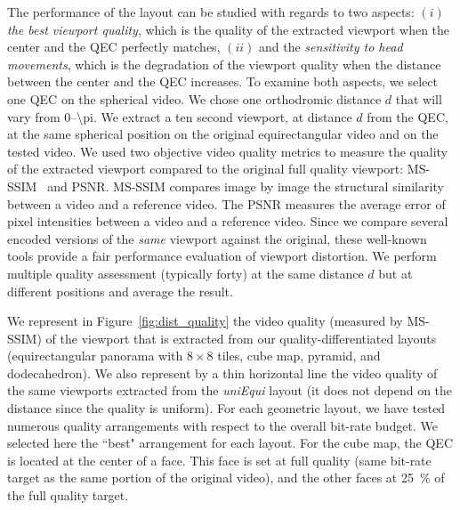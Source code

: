 The performance of the layout can be studied with
regards to two aspects: $(i)$ \emph{the best viewport quality}, which
is the quality of the extracted viewport when the \FoV{} center and
the \ac{QEC} perfectly matches, $(ii)$ and the \emph{sensitivity to
head movements}, which is the degradation of the viewport quality when
the distance between the \FoV{} center and the \ac{QEC} increases.
To examine both aspects, we select one \ac{QEC} on the spherical video.
We chose one orthodromic distance $d$ that will vary from \numrange{0}{\pi}.
We extract a ten second viewport, at distance $d$
from the \ac{QEC}, at the same spherical position on the original
equirectangular video and on the tested video. We used two objective
video quality metrics to measure the quality of the extracted viewport
compared to the original full quality viewport:
\ac{MS-SSIM}~\cite{wang2003multiscale} and
\ac{PSNR}.
\ac{MS-SSIM} compares image by image the structural
similarity between a video and a reference video. The \ac{PSNR} measures the average error of pixel intensities
between a video and a reference video. Since we
compare several encoded versions of the \emph{same} viewport against the
original, these well-known tools provide a fair performance evaluation of viewport distortion.
We perform multiple quality assessment (typically forty) at the same distance $d$ but at different positions and average the result.





We represent in Figure~\ref{fig:dist_quality} the video quality
(measured by \acs{MS-SSIM}) of the viewport that is extracted from our
quality-differentiated layouts (equirectangular panorama with
$8\!\times\! 8$ tiles, cube map, pyramid, and dodecahedron). We also
represent by a thin horizontal line the video quality of the same
viewports extracted from the \textit{uniEqui} layout (it does
not depend on the distance since the quality is uniform). For each
geometric layout, we have tested numerous quality arrangements with
respect to the overall bit-rate budget. We selected here the ``best"
arrangement for each layout. For the cube map,
the
\ac{QEC} is located at the center of a face. This face is set at full
quality (same bit-rate target as the same portion of the original
video), and the other faces at \SI{25}{\percent} of the
full quality target.

